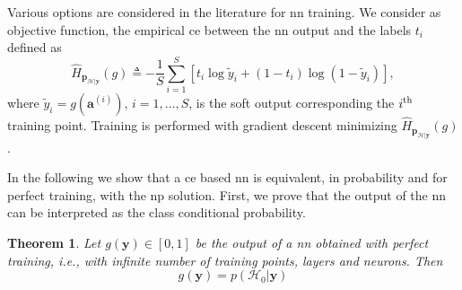 \documentclass[conference,draftcls,onecolumn]{IEEEtran}
\newcommand{\hatcross}[2]{\hat{H}_{#1}(#2)}
\newcommand{\gy}{g(\bm y)}
\newtheorem{theorem}{Theorem}
\begin{document}
Various options are considered in the literature for \ac{nn} training. We consider as objective function, the empirical \ac{ce} between the \ac{nn} output and the labels $t_i$ defined as
\begin{equation}\label{eq:ce}
\hatcross{\bm p_{\mathcal{H}|\bm y}}{g} \triangleq -\frac{1}{S} \sum_{i=1}^{S}\left[t_i\log \tilde{y}_i +\left(1-t_i\right)\log\left(1-\tilde{y}_i\right)\right],
\end{equation}
where $\tilde{y}_i = g(\bm a^{(i)})$, $i=1, \ldots, S$, is the soft output corresponding the $i^{\rm th}$  training point. Training is performed with gradient descent minimizing $\hatcross{\bm p_{\mathcal{H}|\bm y}}{g}$.

In the following we show that a \ac{ce} based \ac{nn} is equivalent, in probability and for perfect training, with the \ac{np} solution. First, we prove that the output of the \ac{nn} can be interpreted as the class conditional probability. 
\begin{theorem}
Let $\gy \in [0,1]$ be the output of a \ac{nn} obtained with perfect training, i.e., with infinite number of training points, layers and neurons. Then
\begin{equation}
	\gy = p(\mathcal{H}_0|\bm y)	
\end{equation}
\end{theorem}
\end{document}
